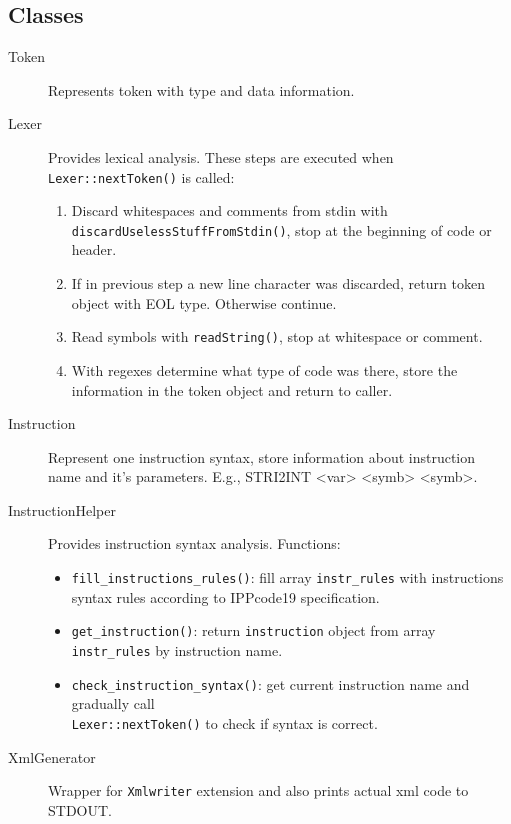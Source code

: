 \documentclass[10pt, a4paper]{article}
\begin{document}
\subsection*{Classes}
\begin{adjustwidth}{0.5cm}{}

\begin{description}
	\item[Token]Represents token with type and data information.
\end{description}

\begin{description}
	\item[Lexer] Provides lexical analysis. These steps are executed when \texttt{Lexer::nextToken()} is called:
	\begin{enumerate}
		\item Discard whitespaces and comments from stdin with \texttt{discardUselessStuffFromStdin()}, stop at the beginning 	of 	code or header.
		\item If in previous step a new line character was discarded, return token object with EOL type. Otherwise continue.
		\item Read symbols with \texttt{readString()}, stop at whitespace or comment.
		\item With regexes determine what type of code was there, store the information in the token object and return to caller.
	\end{enumerate}
\end{description}

\begin{description}
	\item[Instruction] Represent one instruction syntax, store information about instruction name and it's parameters. E.g., STRI2INT <var> <symb> <symb>.
\end{description}

\begin{description}
	\item[InstructionHelper] Provides instruction syntax analysis. Functions:
	\begin{itemize}
	   \item \texttt{fill\_instructions\_rules()}: fill array \texttt{instr\_rules} with instructions syntax rules according to IPPcode19 specification.
	   \item \texttt{get\_instruction()}: return \texttt{instruction} object from array \texttt{instr\_rules} by instruction name.
	   \item \texttt{check\_instruction\_syntax()}: get current instruction name and gradually call\\ \texttt{Lexer::nextToken()} to check if syntax is correct.
	\end{itemize}
\end{description}

\begin{description}
	\item[XmlGenerator] Wrapper for \texttt{Xmlwriter} extension and also prints actual xml code to STDOUT.
\end{description}
 
\end{adjustwidth} 
\end{document}
